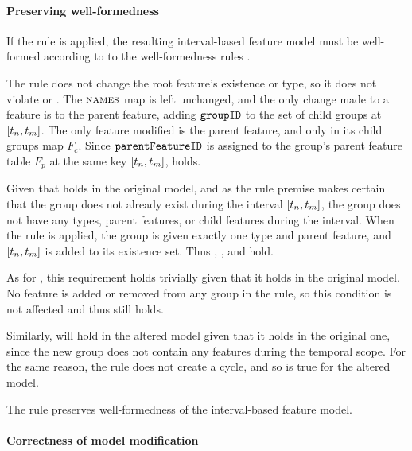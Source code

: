 \paragraph{Preserving well-formedness}

If the  rule is applied, the resulting interval-based feature model must be well-formed according to to the well-formedness rules . 

The rule does not change the root feature's existence or type, so it does not violate  or . The $\textsc{names}{}$ map is left unchanged, and the only change made to a feature is to the parent feature, adding $\texttt{groupID}$ to the set of child groups at $\interval{t_n}{t_m}$. The only feature modified is the parent feature, and only in its child groups map $F_c$. Since $\texttt{parentFeatureID}$ is assigned to the group's parent feature table $F_p$ at the same key $\interval{t_n}{t_m}$,  holds.

Given that  holds in the original model, and as the rule premise makes certain that the group does not already exist during the interval $\interval{t_n}{t_m}$, the group does not have any types, parent features, or child features during the interval. When the rule is applied, the group is given exactly one type and parent feature, and $\interval{t_n}{t_m}$ is added to its existence set. Thus , , and  hold. 

As for , this requirement holds trivially given that it holds in the original model. No feature is added or removed from any group in the  rule, so this condition is not affected and thus still holds.

Similarly,  will hold in the altered model given that it holds in the original one, since the new group does not contain any features during the temporal scope. For the same reason, the rule does not create a cycle, and so  is true for the altered model.
\\

\begin{lemma}
   The  rule preserves well-formedness of the interval-based feature model.
   \label{lemma:add-group-well-formed}
\end{lemma}

\paragraph{Correctness of model modification}

